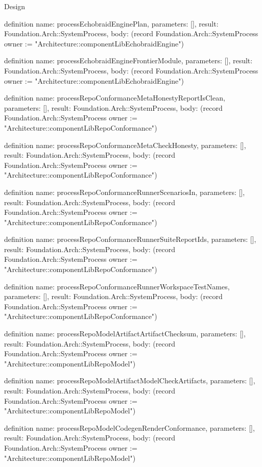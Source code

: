 \begin{lexlean}{Design}
\begin{semanticmodule}
definition{
  name: processEchobraidEnginePlan,
  parameters: [],
  result: Foundation.Arch::SystemProcess,
  body: (record Foundation.Arch::SystemProcess {owner := "Architecture::componentLibEchobraidEngine"})
}

definition{
  name: processEchobraidEngineFrontierModule,
  parameters: [],
  result: Foundation.Arch::SystemProcess,
  body: (record Foundation.Arch::SystemProcess {owner := "Architecture::componentLibEchobraidEngine"})
}

definition{
  name: processRepoConformanceMetaHonestyReportIsClean,
  parameters: [],
  result: Foundation.Arch::SystemProcess,
  body: (record Foundation.Arch::SystemProcess {owner := "Architecture::componentLibRepoConformance"})
}

definition{
  name: processRepoConformanceMetaCheckHonesty,
  parameters: [],
  result: Foundation.Arch::SystemProcess,
  body: (record Foundation.Arch::SystemProcess {owner := "Architecture::componentLibRepoConformance"})
}

definition{
  name: processRepoConformanceRunnerScenariosIn,
  parameters: [],
  result: Foundation.Arch::SystemProcess,
  body: (record Foundation.Arch::SystemProcess {owner := "Architecture::componentLibRepoConformance"})
}

definition{
  name: processRepoConformanceRunnerSuiteReportIds,
  parameters: [],
  result: Foundation.Arch::SystemProcess,
  body: (record Foundation.Arch::SystemProcess {owner := "Architecture::componentLibRepoConformance"})
}

definition{
  name: processRepoConformanceRunnerWorkspaceTestNames,
  parameters: [],
  result: Foundation.Arch::SystemProcess,
  body: (record Foundation.Arch::SystemProcess {owner := "Architecture::componentLibRepoConformance"})
}

definition{
  name: processRepoModelArtifactArtifactChecksum,
  parameters: [],
  result: Foundation.Arch::SystemProcess,
  body: (record Foundation.Arch::SystemProcess {owner := "Architecture::componentLibRepoModel"})
}

definition{
  name: processRepoModelArtifactModelCheckArtifacts,
  parameters: [],
  result: Foundation.Arch::SystemProcess,
  body: (record Foundation.Arch::SystemProcess {owner := "Architecture::componentLibRepoModel"})
}

definition{
  name: processRepoModelCodegenRenderConformance,
  parameters: [],
  result: Foundation.Arch::SystemProcess,
  body: (record Foundation.Arch::SystemProcess {owner := "Architecture::componentLibRepoModel"})
}


\end{semanticmodule}
\end{lexlean}
